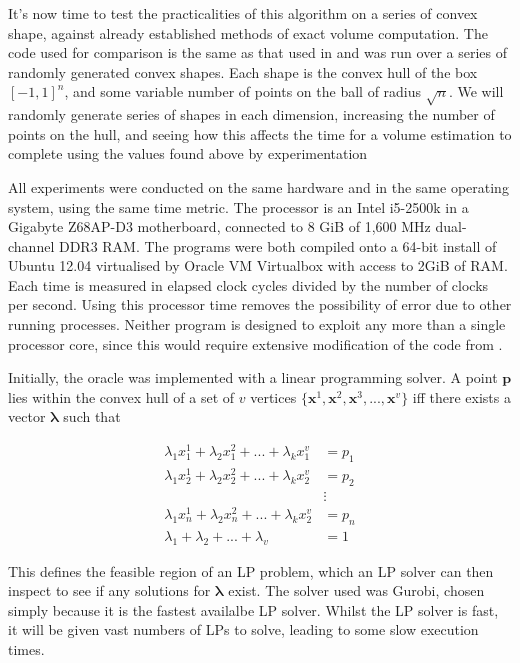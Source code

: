 It's now time to test the practicalities of this algorithm on a series of convex shape, against already established methods of exact volume computation. The code used for comparison is the same as that used in \cite{Bueler98}
and was run over a series of randomly generated convex shapes. Each shape is the convex hull of the box $[-1,1]^n$, and some variable number of points on the ball of radius $\sqrt n$. We will randomly generate series of shapes in each dimension, increasing the number of points on the hull, and seeing how this affects the time for a volume estimation to complete using the values found above by experimentation

All experiments were conducted on the same hardware and in the same operating system, using the same time metric. The processor is an Intel i5-2500k in a Gigabyte Z68AP-D3 motherboard, connected to 8 GiB of 1,600 MHz dual-channel DDR3 RAM. The programs were both compiled onto a 64-bit install of Ubuntu 12.04 virtualised by Oracle VM Virtualbox with access to 2GiB of RAM. Each time is measured in elapsed clock cycles divided by the number of clocks per second. Using this processor time removes the possibility of error due to other running processes. Neither program is designed to exploit any more than a single processor core, since this would require extensive modification of the code from \cite{Bueler98}.

Initially, the oracle was implemented with a linear programming solver. A point ${\bm p}$ lies within the convex hull of a set of $v$ vertices $\{{\bm x}^1, {\bm x}^2, {\bm x}^3, ..., {\bm x}^v\}$ iff there exists a vector ${\bm \lambda}$ such that

\begin{align*}
\lambda_1 x^1_1 + \lambda_2 x^2_1 + ... + \lambda_k x^v_1 &= p_1 \\
\lambda_1 x^1_2 + \lambda_2 x^2_2 + ... + \lambda_k x^v_2 &= p_2 \\
&\vdots \\
\lambda_1 x^1_n + \lambda_2 x^2_n + ... + \lambda_k x^v_2 &= p_n \\
\lambda_1 + \lambda_2 + ... + \lambda_v &= 1
\end{align*}

This defines the feasible region of an LP problem, which an LP solver can then inspect to see if any solutions for ${\bm \lambda}$ exist. The solver used was Gurobi, chosen simply because it is the fastest availalbe LP solver. Whilst the LP solver is fast, it will be given vast numbers of LPs to solve, leading to some slow execution times.

